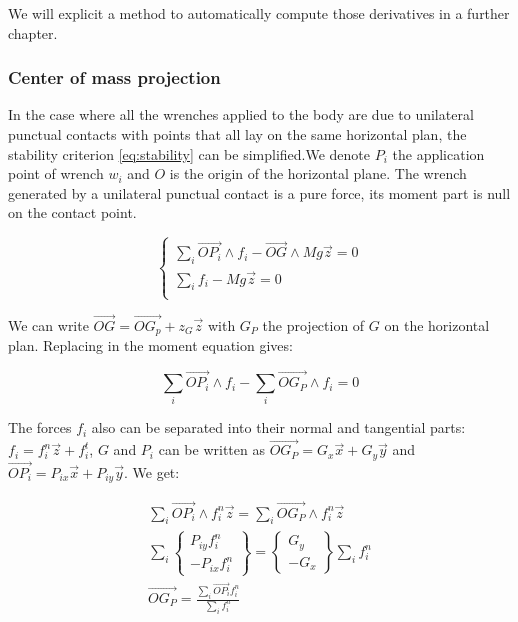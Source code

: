 We will explicit a method to automatically compute those derivatives in a further chapter.

\subsubsection{Center of mass projection}
\label{subsub:center_of_mass_projection}

In the case where all the wrenches applied to the body are due to unilateral punctual contacts with points that all lay on the same horizontal plan, the stability criterion \ref{eq:stability} can be simplified.We denote $P_i$ the application point of wrench $w_i$ and $O$ is the origin of the horizontal plane.
The wrench generated by a unilateral punctual contact is a pure force, its moment part is null on the contact point.

\begin{equation}
\left\{
\begin{array}{r}
  \sum\limits_i \overrightarrow{OP_i}\wedge f_i - \overrightarrow{OG} \wedge Mg\vec{z} = 0 \\
  \sum\limits_i f_i - Mg\vec{z} = 0 \\
\end{array}
\right.
\end{equation}

We can write $\overrightarrow{OG} = \overrightarrow{OG_p} + z_G\vec{z}$ with $G_P$ the projection of $G$ on the horizontal plan. Replacing in the moment equation gives:

\begin{equation}
  \sum\limits_i \overrightarrow{OP_i}\wedge f_i - \sum\limits_i\overrightarrow{OG_P} \wedge f_i = 0
\end{equation}

The forces $f_i$ also can be separated into their normal and tangential parts: $f_i = f_i^n\vec{z} + f_i^t$, $G$ and $P_i$ can be written as $\overrightarrow{OG_P} = G_x \vec{x} + G_y\vec{y}$ and $\overrightarrow{OP_i} = P_{ix} \vec{x} + P_{iy} \vec{y}$. We get:

\begin{align}
  \sum\limits_i \overrightarrow{OP_i}\wedge f_i^n\vec{z} = \sum\limits_i\overrightarrow{OG_P} \wedge f_i^n\vec{z} \\
\sum\limits_i \left\{\begin{array}{r} P_{iy}f_i^n\\-P_{ix}f_i^n\end{array}\right\}
= \left\{\begin{array}{r} G_{y}\\-G_{x}\end{array}\right\} \sum\limits_if_i^n\\
  \overrightarrow{OG_P} = \frac{\sum\limits_i \overrightarrow{OP_i} f_i^n}{\sum\limits_if_i^n}
\end{align}

